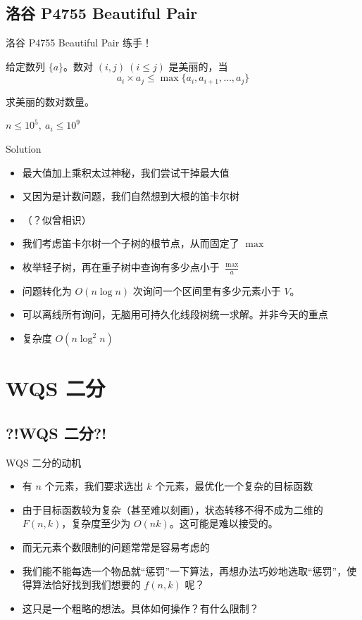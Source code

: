 ﻿\documentclass[aspectratio=169,handout]{ctexbeamer}
\begin{document}
\subsection{洛谷 P4755 Beautiful Pair}
\begin{frame}{洛谷 P4755 Beautiful Pair}
    练手！

    给定数列 $\{a\}$。数对 $(i,j)\ (i\le j)$ 是美丽的，当
    $$a_i\times a_j\le \max\{a_i,a_{i+1},\dots,a_j\}$$
    
    求美丽的数对数量。
    
    $n\le 10^5,\ a_i\le 10^9$
\end{frame}

\begin{frame}{Solution}
    \begin{itemize}
        \item 最大值加上乘积太过神秘，我们尝试干掉最大值
        \item 又因为是计数问题，我们自然想到大根的笛卡尔树
        \item （？似曾相识）
        \item 我们考虑笛卡尔树一个子树的根节点，从而固定了 $\max$
        \item 枚举轻子树，再在重子树中查询有多少点小于 $\frac{\max}{a}$
        \item 问题转化为 $O(n\log n)$ 次询问一个区间里有多少元素小于 $V$。
        \item 可以离线所有询问，无脑用可持久化线段树统一求解。并非今天的重点
        \item 复杂度 $O(n\log^2n)$
    \end{itemize}
\end{frame}









\section{WQS 二分}

\subsection{?!WQS 二分?!}

\begin{frame}{WQS 二分的动机}
    \begin{itemize}
        \item 有 $n$ 个元素，我们要求选出 $k$ 个元素，最优化一个复杂的目标函数
        \item 由于目标函数较为复杂（甚至难以刻画），状态转移不得不成为二维的 $F(n,k)$，复杂度至少为 $O(nk)$。这可能是难以接受的。
        \item 而无元素个数限制的问题常常是容易考虑的
        \item 我们能不能每选一个物品就“惩罚”一下算法，再想办法巧妙地选取“惩罚”，使得算法恰好找到我们想要的 $f(n,k)$ 呢？
        \item 这只是一个粗略的想法。具体如何操作？有什么限制？
    \end{itemize}
\end{frame}
\end{document}
